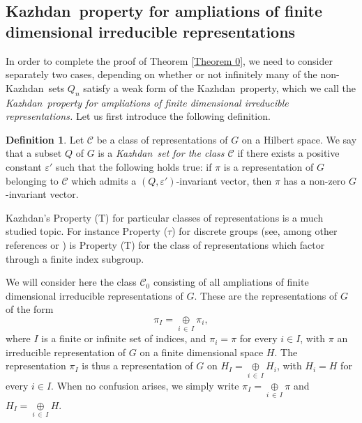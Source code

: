 \documentclass[11pt,english,a4paper]{smfart}
\numberwithin{equation}{section}
\theoremstyle{definition}
\newtheorem{definition}[theorem]{Definition}
\begin{document}
\subsection{{Kazhdan}\ property for ampliations of finite dimensional 
irreducible representations}\label{Section 5.3}
In order to complete the proof of Theorem \ref{Theorem 0}, we need to 
consider 
separately two cases, depending on whether or not infinitely many of the 
non-{Kazhdan}\ sets ${Q_{n}}$ satisfy a weak form of the {Kazhdan}\ property, which we 
call the \emph{{Kazhdan}\ property for ampliations of 
finite dimensional irreducible 
representations.} Let us first introduce the following definition.
\begin{definition}\label{Definition 6.1.1}
 Let $\mathscr{C}$ be a class of representations of $G$ on a Hilbert 
space. 
We say that a subset ${Q}$ of $G$ is a \emph{{Kazhdan}\ set for the class 
$\mathscr{C}$} if there exists a positive constant $\varepsilon 
'$ such that the following holds true: if $\pi $ is a 
representation of $G$ belonging to $\mathscr{C}$ which admits a 
$({Q},\varepsilon')$-invariant vector, then $\pi $ has a 
non-zero $G$-invariant vector.
\end{definition}
Kazhdan's Property (T) for particular classes of representations is a much studied topic. 
For instance Property ($\tau$) for discrete groups 
(see, among other references \cite{Kass2} or \cite{Lub}) is Property (T) 
for the class of representations which factor through a finite index subgroup.
\par\smallskip
We will consider here the class $\mathscr{C}_{0}$ consisting of all 
ampliations of finite dimensional irreducible representations of $G$. 
These are the 
representations of $G$ of the form \[\pi _{I}={\mathop{\oplus}}\limits_{i\,\in\,I}\pi 
_{i},\] 
where $I$ is a finite or infinite set of indices, and $\pi _{i}=\pi $ for 
every $i\in I$, 
with $\pi $ an irreducible representation of $G$ on a 
finite dimensional space $H$. The representation $\pi _{I}$ is thus a 
representation of $G$ on $H_{I}={\mathop{\oplus}}\limits_{i\,\in\,I}H_{i}$, with 
$H_{i}=H$ 
for every $i\in I$. When no confusion arises, we simply write 
$\pi _{I}={\mathop{\oplus}}\limits_{i\,\in\,I}\pi$ and $H_{I}={\mathop{\oplus}}\limits_{i\,\in\,I}H$.
\end{document}
